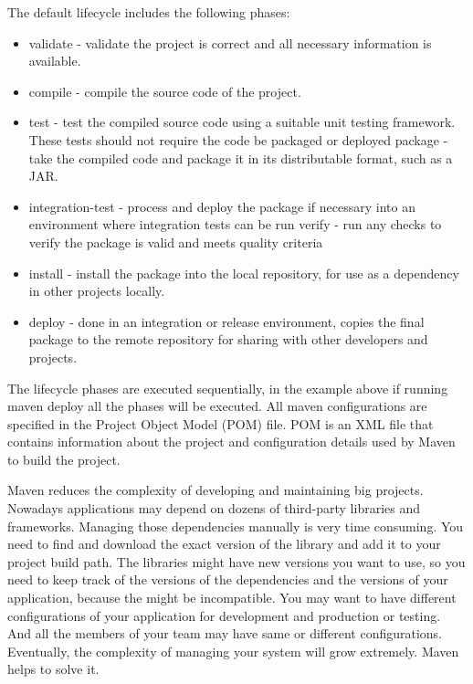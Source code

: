 \documentclass{article}
\begin{document}
  The default lifecycle includes the following phases:
  \begin{itemize}
    \item validate - validate the project is correct and all necessary
    information is available.
    \item compile - compile the source code of the project.
    \item test - test the compiled source code using a suitable unit testing
    framework. These tests should not require the code be packaged or deployed
    package - take the compiled code and package it in its distributable format,
    such as a JAR.
    \item integration-test - process and deploy the package if necessary into an
    environment where integration tests can be run verify - run any checks to
    verify the package is valid and meets quality criteria
    \item install - install the package into the local repository, for use as a
      dependency in other projects locally.
    \item  deploy - done in an integration or
    release environment, copies the final package to the remote repository for
    sharing with other developers and projects.
  \end{itemize}
  
  The lifecycle phases are executed sequentially, in the example above if running maven deploy 
  all the phases will be executed. All maven configurations are specified in the Project Object Model (POM) file.
  POM is an XML file that contains information about the project and configuration details used by Maven 
  to build the project. 

  Maven reduces the complexity of developing and maintaining big projects.
  Nowadays applications may depend on dozens of third-party libraries and
  frameworks. Managing those dependencies manually is very time consuming. You
  need to find and download the exact version of the library and add it to your project build path.
  The libraries might have new versions you want to use, so you need to keep track of the versions
  of the dependencies and the versions of your application, because the might be incompatible. 
  You may want to have different configurations of your application for development and production or testing.
  And all the members of your team may have same or different configurations.
  Eventually, the complexity of managing your system will grow extremely. Maven helps to solve it.
\end{document}
